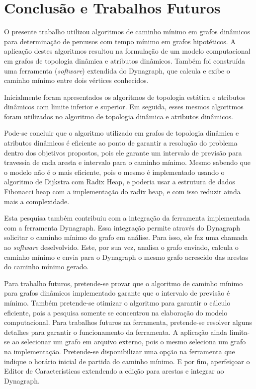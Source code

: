 \chapter{Conclusão e Trabalhos Futuros}

O presente trabalho utilizou algoritmos de caminho mínimo em grafos dinâmicos
para determinação de percusos com tempo mínimo em grafos hipotéticos.
A aplicação destes algoritmos resultou na formulação de um modelo computacional em grafos
de topologia dinâmica e atributos dinâmicos. Também foi construída uma ferramenta (\textit{software})
extendida do Dynagraph, que calcula e exibe o caminho mínimo entre dois vértices conhecidos.

Inicialmente foram apresentados os algoritmos de topologia estática e atributos dinâmicos com
limite inferior e superior. Em seguida, esses mesmos algoritmos foram utilizados no algoritmo
de topologia dinâmica e atributos dinâmicos.

Pode-se concluir que o algoritmo utilizado em grafos de topologia dinâmica e atributos dinâmicos
é eficiente ao ponto de garantir a resolução do problema dentro dos objetivos propostos, pois ele
garante um intervalo de previsão para travessia de cada aresta e intervalo para o caminho mínimo.
Mesmo sabendo que o modelo não é o mais eficiente, pois o mesmo é implementado usando o
algoritmo de Dijkstra com Radix Heap, e poderia usar a estrutura de dados Fibonacci heap com a
implementação do radix heap, e com isso reduzir ainda mais a complexidade.

Esta pesquisa também contribuiu com a integração da ferramenta implementada com a ferramenta Dynagraph.
Essa integração permite através do Dynagraph solicitar o caminho mínimo do grafo em análise. Para isso, ele faz 
uma chamada ao \textit{software} deselvolvido. Este, por sua vez, analisa o grafo enviado, calcula o caminho mínimo
e envia para o Dynagraph o mesmo grafo acrescido das arestas do caminho mínimo gerado.

Para trabalho futuros, pretende-se provar que o algoritmo de caminho mínimo para grafos dinâmicos implementado garante que o
intervalo de previsão é mínimo. Também pretende-se otimizar o algoritmo para garantir o cálculo eficiente, pois a pesquisa
somente se concentrou na elaboração do modelo computacional.
Para trabalhos futuros na ferramenta, pretende-se resolver alguns detalhes para garantir o funcionamento da ferramenta.
A aplicação ainda limita-se ao selecionar um grafo em arquivo externo, pois o mesmo seleciona um grafo na implementação.
Pretende-se disponibilizar uma opção na ferramenta que indique o horário inicial de partida
do caminho mínimo. E por fim, aperfeiçoar o Editor de Características extendendo a edição para arestas e integrar ao Dynagraph.
